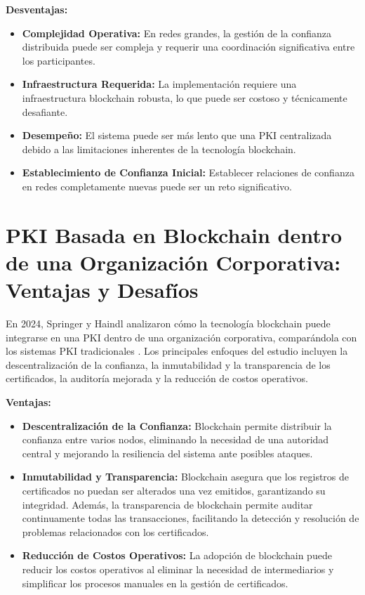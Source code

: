 \textbf{Desventajas:}

\begin{itemize}
  \item \textbf{Complejidad Operativa:} En redes grandes, la gestión de la confianza distribuida puede ser compleja y requerir una coordinación significativa entre los participantes.
  \item \textbf{Infraestructura Requerida:} La implementación requiere una infraestructura blockchain robusta, lo que puede ser costoso y técnicamente desafiante.
  \item \textbf{Desempeño:} El sistema puede ser más lento que una PKI centralizada debido a las limitaciones inherentes de la tecnología blockchain.
  \item \textbf{Establecimiento de Confianza Inicial:} Establecer relaciones de confianza en redes completamente nuevas puede ser un reto significativo.
\end{itemize}
\section{PKI Basada en Blockchain dentro de una Organización Corporativa: Ventajas y Desafíos}

En 2024, Springer y Haindl analizaron cómo la tecnología blockchain puede integrarse en una PKI dentro de una organización corporativa, comparándola con los sistemas PKI tradicionales \cite{Springer2024}. Los principales enfoques del estudio incluyen la descentralización de la confianza, la inmutabilidad y la transparencia de los certificados, la auditoría mejorada y la reducción de costos operativos.

\textbf{Ventajas:}

\begin{itemize}
  \item \textbf{Descentralización de la Confianza:} Blockchain permite distribuir la confianza entre varios nodos, eliminando la necesidad de una autoridad central y mejorando la resiliencia del sistema ante posibles ataques.
  \item \textbf{Inmutabilidad y Transparencia:} Blockchain asegura que los registros de certificados no puedan ser alterados una vez emitidos, garantizando su integridad. Además, la transparencia de blockchain permite auditar continuamente todas las transacciones, facilitando la detección y resolución de problemas relacionados con los certificados.
  \item \textbf{Reducción de Costos Operativos:} La adopción de blockchain puede reducir los costos operativos al eliminar la necesidad de intermediarios y simplificar los procesos manuales en la gestión de certificados.
\end{itemize}

